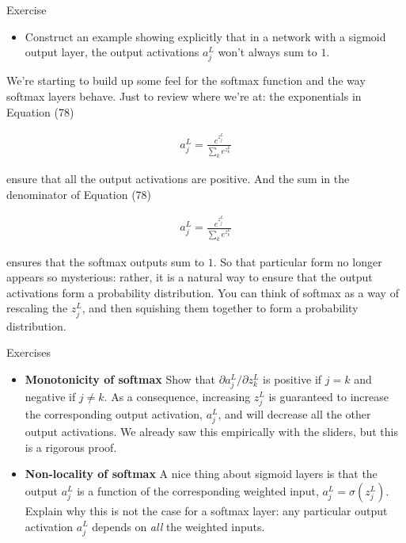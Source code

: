 \begin{exerciseBox}{Exercise}


\begin{itemize}

\item Construct an example showing explicitly that in a network with a sigmoid output layer, the output activations $a^L_j$ won't always sum to $1$.

\end{itemize}


We're starting to build up some feel for the softmax function and the way softmax layers behave. Just to review where we're at: the exponentials in Equation (78)

\begin{align*}
a^L_j = \frac{e^{z^L_j}}{\sum_k e^{z^L_k}} \nonumber
\end{align*}

\noindent ensure that all the output activations are positive. And the sum in the denominator of Equation (78)

\begin{align*}
a^L_j = \frac{e^{z^L_j}}{\sum_k e^{z^L_k}} \nonumber
\end{align*}

\noindent ensures that the softmax outputs sum to $1$. So that particular form no longer appears so mysterious: rather, it is a natural way to ensure that the output activations form a probability distribution. You can think of softmax as a way of rescaling the $z^L_j$, and then squishing them together to form a probability distribution.

\end{exerciseBox}



\begin{exerciseBox}{Exercises}


\begin{itemize}

\item \textbf{Monotonicity of softmax} Show that $\partial a^L_j / \partial z^L_k$ is positive if $j = k$ and negative if $j \neq k$. As a consequence, increasing $z^L_j$ is guaranteed to increase the corresponding output activation, $a^L_j$, and will decrease all the other output activations. We already saw this empirically with the sliders, but this is a rigorous proof.

\item \textbf{Non-locality of softmax} A nice thing about sigmoid layers is that the output $a^L_j$ is a function of the corresponding weighted input, $a^L_j = \sigma(z^L_j)$. Explain why this is not the case for a softmax layer: any particular output activation $a^L_j$ depends on \emph{all} the weighted inputs.

\end{itemize}

\end{exerciseBox}



